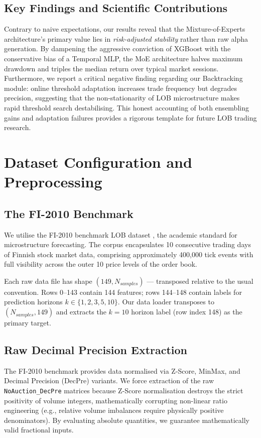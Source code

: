 \documentclass[conference]{IEEEtran}
\begin{document}
\subsection{Key Findings and Scientific Contributions}
Contrary to naive expectations, our results reveal that the Mixture-of-Experts
architecture's primary value lies in \textit{risk-adjusted stability}
rather than raw alpha generation. By dampening the aggressive conviction of
XGBoost with the conservative bias of a Temporal MLP, the MoE architecture
halves maximum drawdown and triples the median return over typical market
sessions. Furthermore, we report a critical negative finding regarding our
Backtracking module: online threshold adaptation increases trade frequency
but degrades precision, suggesting that the non-stationarity of LOB
microstructure makes rapid threshold search destabilising. This honest
accounting of both ensembling gains and adaptation failures provides a
rigorous template for future LOB trading research.

\section{Dataset Configuration and Preprocessing}

\subsection{The FI-2010 Benchmark}
We utilise the FI-2010 benchmark LOB dataset \cite{b1}, the academic
standard for microstructure forecasting. The corpus encapsulates 10
consecutive trading days of Finnish stock market data, comprising
approximately 400,000 tick events with full visibility across the outer
10 price levels of the order book.

Each raw data file has shape $(149, N_{samples})$ --- transposed relative
to the usual convention. Rows 0--143 contain 144 features; rows 144--148
contain labels for prediction horizons $k \in \{1, 2, 3, 5, 10\}$. Our
data loader transposes to $(N_{samples}, 149)$ and extracts the $k=10$
horizon label (row index 148) as the primary target.

\subsection{Raw Decimal Precision Extraction}
The FI-2010 benchmark provides data normalised via Z-Score, MinMax, and
Decimal Precision (DecPre) variants. We force extraction of the raw
\texttt{NoAuction\_DecPre} matrices because Z-Score normalisation destroys
the strict positivity of volume integers, mathematically corrupting
non-linear ratio engineering (e.g., relative volume imbalances require
physically positive denominators). By evaluating absolute quantities, we
guarantee mathematically valid fractional inputs.
\end{document}
